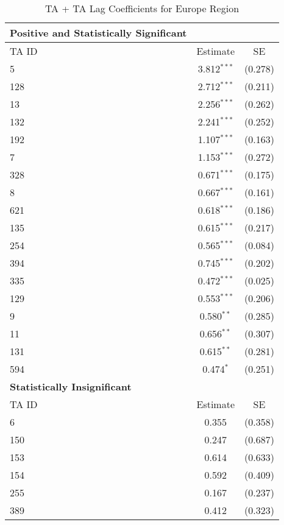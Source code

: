 \begin{table}[htbp]
    \centering
    \caption{TA + TA Lag Coefficients for Europe Region}
    \label{tab:pta_europe}
    \begin{adjustbox}{max width=\textwidth}
    \begin{tabular}{lcc}
    \hline
    \textbf{Positive and Statistically Significant} &  &  \\
    \hline
    TA ID & Estimate & SE \\
    \hline
    5   & 3.812$^{\ast\ast\ast}$ & (0.278) \\
    128 & 2.712$^{\ast\ast\ast}$ & (0.211) \\
    13  & 2.256$^{\ast\ast\ast}$ & (0.262) \\
    132 & 2.241$^{\ast\ast\ast}$ & (0.252) \\
    192 & 1.107$^{\ast\ast\ast}$ & (0.163) \\
    7   & 1.153$^{\ast\ast\ast}$ & (0.272) \\
    328 & 0.671$^{\ast\ast\ast}$ & (0.175) \\
    8   & 0.667$^{\ast\ast\ast}$ & (0.161) \\
    621 & 0.618$^{\ast\ast\ast}$ & (0.186) \\
    135 & 0.615$^{\ast\ast\ast}$ & (0.217) \\
    254 & 0.565$^{\ast\ast\ast}$ & (0.084) \\
    394 & 0.745$^{\ast\ast\ast}$ & (0.202) \\
    335 & 0.472$^{\ast\ast\ast}$ & (0.025) \\
    129 & 0.553$^{\ast\ast\ast}$ & (0.206) \\
    9   & 0.580$^{\ast\ast}$ & (0.285) \\
    11  & 0.656$^{\ast\ast}$ & (0.307) \\
    131 & 0.615$^{\ast\ast}$ & (0.281) \\
    594 & 0.474$^{\ast}$ & (0.251) \\
    \hline
    \textbf{Statistically Insignificant} &  &  \\
    \hline
    TA ID & Estimate & SE \\
    \hline
    6   & 0.355 & (0.358) \\
    150 & 0.247 & (0.687) \\
    153 & 0.614 & (0.633) \\
    154 & 0.592 & (0.409) \\
    255 & 0.167 & (0.237) \\
    389 & 0.412 & (0.323) \\

\end{tabular}
\end{adjustbox}
\end{table}
